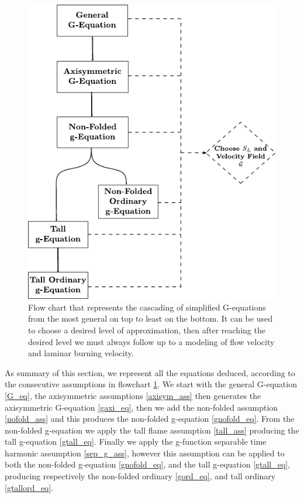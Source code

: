 \begin{figure}[!h]
\begin{center}
\includegraphics[scale=1.2]{./img/equation_flowchart}
\end{center}
\caption{Flow chart that represents the cascading of simplified G-equations from the most general on top to least on the bottom. It can be used to choose a desired level of approximation, then after reaching the desired level we must always follow up to a modeling of flow velocity and laminar burning velocity.}
\label{equation_flowchart}
\end{figure}
\vspace{8mm}
As summary of this section, we represent all the equations deduced, according to the consecutive assumptions in flowchart \ref{equation_flowchart}. We start with the general G-equation \eqref{G_eq}, the axisymmetric assumptions \ref{axisym_ass} then generates the axisymmetric G-equation \eqref{gaxi_eq}, then we add the non-folded assumption \ref{nofold_ass} and this produces the non-folded g-equation \eqref{gnofold_eq}. From the non-folded g-equation we apply the tall flame assumption \ref{tall_ass} producing the tall g-equation \eqref{gtall_eq}. Finally we apply the g-function separable time harmonic assumption \ref{sep_g_ass}, however this assumption can be applied to both the non-folded g-equation \eqref{gnofold_eq}, and the tall g-equation \eqref{gtall_eq}, producing respectively the non-folded ordinary \eqref{gord_eq}, and tall ordinary \eqref{gtallord_eq}.





